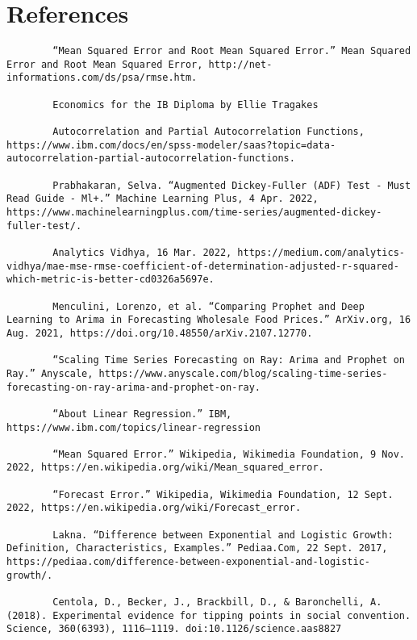 \documentclass{mcm}
\numberwithin{figure}{section}
\numberwithin{table}{section}
\numberwithin{equation}{section}
\begin{document}
    \section{References}
    \lstset{
        basicstyle=\smaller\ttfamily,
        columns=flexible,
        breaklines=true
    }
    \begin{lstlisting}
        “Mean Squared Error and Root Mean Squared Error.” Mean Squared Error and Root Mean Squared Error, http://net-informations.com/ds/psa/rmse.htm.

        Economics for the IB Diploma by Ellie Tragakes  

        Autocorrelation and Partial Autocorrelation Functions, https://www.ibm.com/docs/en/spss-modeler/saas?topic=data-autocorrelation-partial-autocorrelation-functions. 

        Prabhakaran, Selva. “Augmented Dickey-Fuller (ADF) Test - Must Read Guide - Ml+.” Machine Learning Plus, 4 Apr. 2022, https://www.machinelearningplus.com/time-series/augmented-dickey-fuller-test/. 

        Analytics Vidhya, 16 Mar. 2022, https://medium.com/analytics-vidhya/mae-mse-rmse-coefficient-of-determination-adjusted-r-squared-which-metric-is-better-cd0326a5697e.

        Menculini, Lorenzo, et al. “Comparing Prophet and Deep Learning to Arima in Forecasting Wholesale Food Prices.” ArXiv.org, 16 Aug. 2021, https://doi.org/10.48550/arXiv.2107.12770.

        “Scaling Time Series Forecasting on Ray: Arima and Prophet on Ray.” Anyscale, https://www.anyscale.com/blog/scaling-time-series-forecasting-on-ray-arima-and-prophet-on-ray.

        “About Linear Regression.” IBM, https://www.ibm.com/topics/linear-regression

        “Mean Squared Error.” Wikipedia, Wikimedia Foundation, 9 Nov. 2022, https://en.wikipedia.org/wiki/Mean_squared_error. 

        “Forecast Error.” Wikipedia, Wikimedia Foundation, 12 Sept. 2022, https://en.wikipedia.org/wiki/Forecast_error.

        Lakna. “Difference between Exponential and Logistic Growth: Definition, Characteristics, Examples.” Pediaa.Com, 22 Sept. 2017, https://pediaa.com/difference-between-exponential-and-logistic-growth/.

        Centola, D., Becker, J., Brackbill, D., & Baronchelli, A. (2018). Experimental evidence for tipping points in social convention. Science, 360(6393), 1116–1119. doi:10.1126/science.aas8827 


\end{lstlisting}
\end{document}
